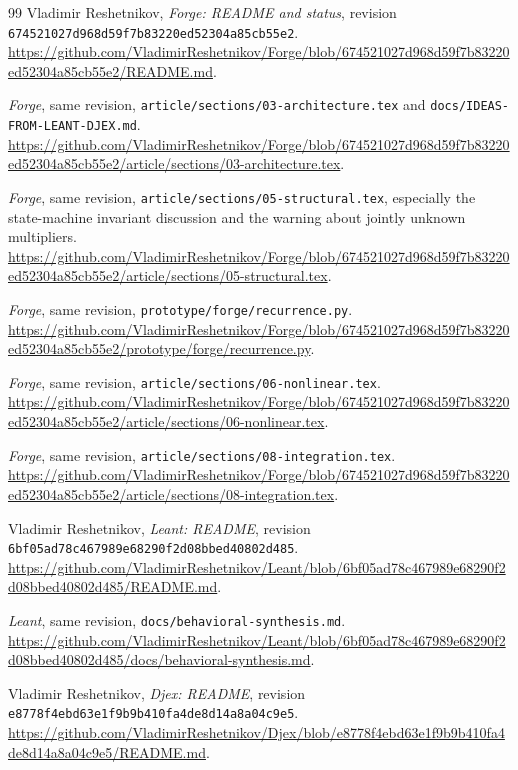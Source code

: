 \documentclass[11pt,letterpaper]{article}
\theoremstyle{definition}
\newcommand{\code}[1]{\nolinkurl{#1}}
\begin{document}
\begin{thebibliography}{99}
\small
{} Vladimir Reshetnikov, \emph{Forge: README and status},
revision \code{674521027d968d59f7b83220ed52304a85cb55e2}.
\url{https://github.com/VladimirReshetnikov/Forge/blob/674521027d968d59f7b83220ed52304a85cb55e2/README.md}.

 \emph{Forge}, same revision,
\code{article/sections/03-architecture.tex} and
\code{docs/IDEAS-FROM-LEANT-DJEX.md}.
\url{https://github.com/VladimirReshetnikov/Forge/blob/674521027d968d59f7b83220ed52304a85cb55e2/article/sections/03-architecture.tex}.

 \emph{Forge}, same revision,
\code{article/sections/05-structural.tex}, especially the state-machine
invariant discussion and the warning about jointly unknown multipliers.
\url{https://github.com/VladimirReshetnikov/Forge/blob/674521027d968d59f7b83220ed52304a85cb55e2/article/sections/05-structural.tex}.

 \emph{Forge}, same revision,
\code{prototype/forge/recurrence.py}.
\url{https://github.com/VladimirReshetnikov/Forge/blob/674521027d968d59f7b83220ed52304a85cb55e2/prototype/forge/recurrence.py}.

 \emph{Forge}, same revision,
\code{article/sections/06-nonlinear.tex}.
\url{https://github.com/VladimirReshetnikov/Forge/blob/674521027d968d59f7b83220ed52304a85cb55e2/article/sections/06-nonlinear.tex}.

 \emph{Forge}, same revision,
\code{article/sections/08-integration.tex}.
\url{https://github.com/VladimirReshetnikov/Forge/blob/674521027d968d59f7b83220ed52304a85cb55e2/article/sections/08-integration.tex}.

 Vladimir Reshetnikov, \emph{Leant: README}, revision
\code{6bf05ad78c467989e68290f2d08bbed40802d485}.
\url{https://github.com/VladimirReshetnikov/Leant/blob/6bf05ad78c467989e68290f2d08bbed40802d485/README.md}.

 \emph{Leant}, same revision,
\code{docs/behavioral-synthesis.md}.
\url{https://github.com/VladimirReshetnikov/Leant/blob/6bf05ad78c467989e68290f2d08bbed40802d485/docs/behavioral-synthesis.md}.

 Vladimir Reshetnikov, \emph{Djex: README}, revision
\code{e8778f4ebd63e1f9b9b410fa4de8d14a8a04c9e5}.
\url{https://github.com/VladimirReshetnikov/Djex/blob/e8778f4ebd63e1f9b9b410fa4de8d14a8a04c9e5/README.md}.


\end{thebibliography}
\end{document}
